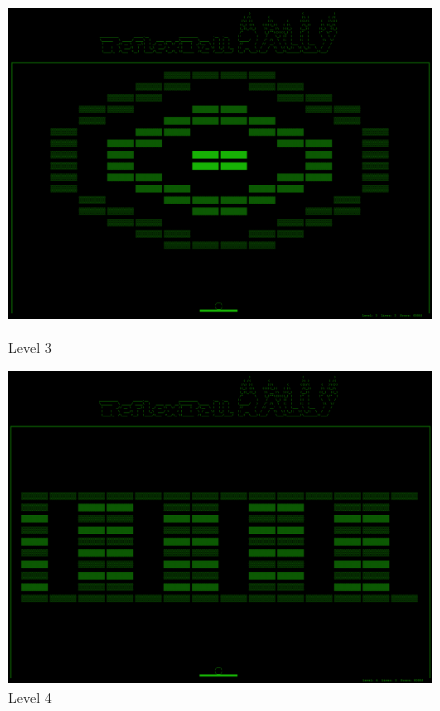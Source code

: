 \begin{figure}[ht]
\begin{minipage}[b]{0.5\linewidth}
\centering
\includegraphics[width=\textwidth]{figs/screenshots/level3.png}
\caption{Level 3}
\label{fig:level3}
\end{minipage}
\hspace{0.5cm}
\begin{minipage}[b]{0.5\linewidth}
\centering
\includegraphics[width=\textwidth]{figs/screenshots/level4.png}
\caption{Level 4}
\label{fig:level4}
\end{minipage}
\end{figure}

